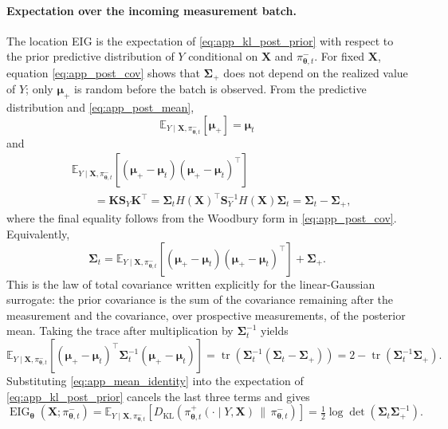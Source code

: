 \documentclass{article}
\DeclareMathOperator{\tr}{tr}
\newcommand{\E}{\mathbb{E}}
\newcommand{\bs}[1]{\boldsymbol{#1}}
\newcommand{\bX}{\mathbf{X}}
\newcommand{\KL}[2]{D_{\mathrm{KL}}\!\left(#1\,\|\,#2\right)}
\begin{document}
\paragraph{Expectation over the incoming measurement batch.}
The location EIG is the expectation of \eqref{eq:app_kl_post_prior} with respect to the prior predictive distribution of $Y$ conditional on $\bX$ and $\pi_{\bs\theta,t}^-$.
For fixed $\bX$, equation \eqref{eq:app_post_cov} shows that $\bs\Sigma_+$ does not depend on the realized value of $Y$; only $\bs\mu_+$ is random before the batch is observed.
From the predictive distribution and \eqref{eq:app_post_mean},
\begin{equation}
\E_{Y\mid\bX,\pi_{\bs\theta,t}^-}[\bs\mu_+]
=\bs\mu_t
\end{equation}
and
\begin{align}
&\E_{Y\mid\bX,\pi_{\bs\theta,t}^-}\!\left[
(\bs\mu_+-\bs\mu_t)(\bs\mu_+-\bs\mu_t)^\top
\right]\\
&\qquad
=\bs K\bs S_Y\bs K^\top
=\bs\Sigma_tH(\bX)^\top\bs S_Y^{-1}H(\bX)\bs\Sigma_t
=\bs\Sigma_t-\bs\Sigma_+,
\end{align}
where the final equality follows from the Woodbury form in \eqref{eq:app_post_cov}.
Equivalently,
\begin{equation}
\bs\Sigma_t
=
\E_{Y\mid\bX,\pi_{\bs\theta,t}^-}\!\left[
(\bs\mu_+-\bs\mu_t)(\bs\mu_+-\bs\mu_t)^\top
\right]
+\bs\Sigma_+.
\end{equation}
This is the law of total covariance written explicitly for the linear-Gaussian surrogate: the prior covariance is the sum of the covariance remaining after the measurement and the covariance, over prospective measurements, of the posterior mean.
Taking the trace after multiplication by $\bs\Sigma_t^{-1}$ yields
\begin{equation}
\label{eq:app_mean_identity}
\E_{Y\mid\bX,\pi_{\bs\theta,t}^-}\!\left[
(\bs\mu_+-\bs\mu_t)^\top \bs\Sigma_t^{-1}(\bs\mu_+-\bs\mu_t)
\right]
=
\tr\!\left(\bs\Sigma_t^{-1}(\bs\Sigma_t-\bs\Sigma_+)\right)
=
2-\tr(\bs\Sigma_t^{-1}\bs\Sigma_+).
\end{equation}
Substituting \eqref{eq:app_mean_identity} into the expectation of \eqref{eq:app_kl_post_prior} cancels the last three terms and gives
\begin{equation}
\label{eq:app_eig_logdet_ratio}
\operatorname{EIG}_{\bs\theta}(\bX;\pi_{\bs\theta,t}^-)
=
\E_{Y\mid\bX,\pi_{\bs\theta,t}^-}\!\left[
\KL{\pi_{\bs\theta,t}^+(\cdot\mid Y,\bX)}{\pi_{\bs\theta,t}^-}
\right]
=
\tfrac12\log\det(\bs\Sigma_t\bs\Sigma_+^{-1}).
\end{equation}
\end{document}

